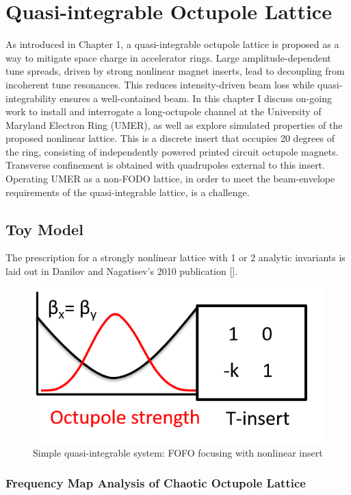 
\renewcommand{\thechapter}{5}

\chapter{Quasi-integrable Octupole Lattice}

As introduced in Chapter 1, a quasi-integrable octupole lattice is proposed as a way to mitigate space charge in accelerator rings. Large amplitude-dependent tune spreads, driven by strong nonlinear magnet inserts, lead to decoupling from incoherent tune resonances. This reduces intensity-driven beam loss while quasi-integrability ensures a well-contained beam. In this chapter I discuss on-going work to install and interrogate a long-octupole channel at the University of Maryland Electron Ring (UMER), as well as explore simulated properties of the proposed nonlinear lattice. This is a discrete insert that occupies 20 degrees of the ring, consisting of independently powered printed circuit octupole magnets. Transverse confinement is obtained with quadrupoles external to this insert. Operating UMER as a non-FODO lattice, in order to meet the beam-envelope requirements of the quasi-integrable lattice, is a challenge. 




\section{Toy Model}

The prescription for a strongly nonlinear lattice with 1 or 2 analytic invariants is laid out in Danilov and Nagatisev's 2010 publication [\cite{Danilov2010}].


\begin{figure}
\centering
\includegraphics[width=.3\textwidth]{2.figures/toy_model.png}
\caption{Simple quasi-integrable system: FOFO focusing with nonlinear insert }
\label{fig:toymodel}
\end{figure}




\subsection{Frequency Map Analysis of Chaotic Octupole Lattice}

